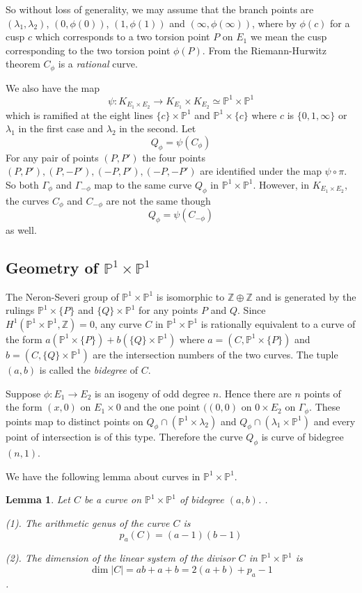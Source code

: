 \documentclass[11pt,a4paper]{article}
\newtheorem{lem}[defn]{Lemma}
\newcommand {\ZZ}{{\mathds Z}}
\newcommand {\CP}{{\mathds P}}
\newcommand {\lb}{{\lambda}}
\newcommand {\KE}{{K_{E_1 \times E_2}}}
\newcommand {\CPP}{\CP^1 \times \CP^1}
\def\dim{\operatorname{dim}}
\begin{document}
So without loss of generality, we may assume that the branch points are  $(\lb_1,\lb_2)$, $(0,\phi(0))$, $(1,\phi(1))$ and $(\infty,\phi(\infty))$, where by $\phi(c)$ for a cusp $c$ which corresponds to a two torsion point $P$ on $E_1$ we mean the cusp corresponding to the two torsion point $\phi(P)$. From the Riemann-Hurwitz theorem  $C_{\phi}$ is a {\em rational} curve. 

We also have the map 
%
$$\psi: \KE\longrightarrow K_{E_1} \times K_{E_2} \simeq \CPP$$
%
which is ramified at the eight lines $\{c\} \times \CP^1$ and $\CP^1 \times \{c\}$ where $c$ is $\{0,1,\infty\}$ or $\lb_1$ in the first case and $\lb_2$ in the second. Let 
%
$$Q_{\phi}=\psi(C_{\phi})$$
%
For any pair of points $(P,P')$ the four points $(P,P'), (P,-P'), (-P,P'), (-P,-P')$ are identified under the map $\psi \circ \pi$. So both  $\Gamma_{\phi}$ and $\Gamma_{-\phi}$ map to the same curve $Q_{\phi}$ in $\CPP$. However, in $\KE$, the curves $C_{\phi}$ and $C_{-\phi}$ are not the same though
%
$$Q_{\phi}=\psi(C_{-\phi})$$
%
as well. 
\subsection{Geometry of $\CPP$}

The Neron-Severi group of $\CPP$ is isomorphic to $\ZZ\oplus \ZZ$ and is  generated by the rulings $\CP^1 \times \{P\}$ and $\{Q\} \times \CP^1$ for any points $P$ and $Q$.  Since $H^1(\CPP,\ZZ)=0$, any curve  $C$ in $\CPP$ is rationally equivalent to a curve of the form $a(\CP^1\times \{P\}) + b(\{Q\} \times \CP^1)$ where $a=(C,\CP^1 \times \{P\})$ and $b=(C,\{Q\} \times \CP^1)$ are the intersection numbers of the two curves. The tuple $(a,b)$ is called the {\em bidegree} of $C$. 

Suppose $\phi:E_1 \rightarrow E_2$ is an isogeny of odd degree $n$.  
Hence there are $n$ points of the form $(x,0)$ on $E_1\times 0$ and the one point $((0,0)$ on $0 \times E_2$ on $\Gamma_{\phi}$. These points map to distinct points on $Q_{\phi} \cap (\CP^1 \times \lb_2)$ and $Q_{\phi} \cap (\lb_1 \times \CP^1)$ and every point of intersection is of this type. Therefore the curve $Q_{\phi}$ is curve of bidegree $(n,1)$. 

We have the following lemma about curves in $\CPP$.


\begin{lem} Let $C$ be a curve on $\CPP$  of bidegree $(a,b)$. 
	\label{coray}. 
	
	\vspace{\baselineskip}
	
\noindent (1). The arithmetic genus of the curve $C$ is 
	$$p_a(C)=(a-1)(b-1)$$ 
	
\noindent (2). The dimension of the linear system of the divisor $C$ in $\CPP$ is $$\dim|C|=ab+a+b=2(a+b)+p_a-1$$. 
	
\end{lem}
\end{document}
